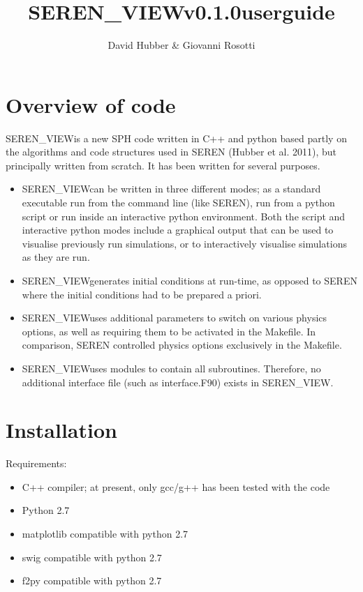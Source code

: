 \documentclass[a4paper]{article}
\newcommand{\CODENAME}{SEREN\_VIEW}
\newcommand{\VERNO}{0.1.0}
\begin{document}
\title{\CODENAME v\VERNO userguide}
\author{David Hubber \& Giovanni Rosotti}

\maketitle
\tableofcontents

\newpage


\section{Overview of code}
\CODENAME is a new SPH code written in C++ and python based partly on the algorithms and code structures used in SEREN (Hubber et al. 2011), but principally written from scratch.  It has been written for several purposes.
\begin{itemize}
\item \CODENAME can be written in three different modes; as a standard executable run from the command line (like SEREN), run from a python script or run inside an interactive python environment.  Both the script and interactive python modes include a graphical output that can be used to visualise previously run simulations, or to interactively visualise simulations as they are run.
\item \CODENAME generates initial conditions at run-time, as opposed to SEREN where the initial conditions had to be prepared a priori.
\item \CODENAME uses additional parameters to switch on various physics options, as well as requiring them to be activated in the Makefile.  In comparison, SEREN controlled physics options exclusively in the Makefile.
\item \CODENAME uses modules to contain all subroutines.  Therefore, no additional interface file (such as interface.F90) exists in SEREN\_VIEW.
\end{itemize}


\section{Installation} \label{S:INSTALL}
Requirements:
\begin{itemize}
\item C++ compiler; at present, only gcc/g++ has been tested with the code
\item Python 2.7
\item matplotlib compatible with python 2.7
\item swig compatible with python 2.7
\item f2py compatible with python 2.7
\end{itemize}
\end{document}
